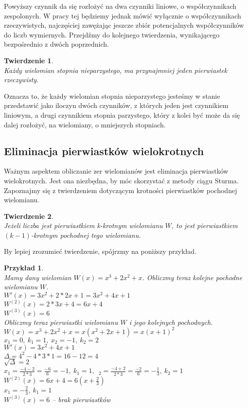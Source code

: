 \documentclass[twoside,a4paper]{book}
\newtheorem{theorem}{Twierdzenie}
\newtheorem{example}{Przykład}
\begin{document}
Powyższy czynnik da się rozłożyć na dwa czynniki liniowe, o współczynnikach zespolonych. W pracy tej będziemy jednak mówić wyłącznie o współczynnikach rzeczywistych, najczęściej zawężając jeszcze zbiór potencjalnych współczynników do liczb wymiernych. Przejdźmy do kolejnego twierdzenia, wynikającego bezpośrednio z dwóch poprzednich.

\begin{theorem}
	$ $\\
	Każdy wielomian stopnia nieparzystego, ma przynajmniej jeden pierwiastek rzeczywisty.
\end{theorem}

Oznacza to, że każdy wielomian stopnia nieparzystego jesteśmy w stanie przedstawić jako iloczyn dwóch czynników, z których jeden jest czynnikiem liniowym, a drugi czynnikiem stopnia parzystego, który z kolei być może da się dalej rozłożyć, na wielomiany, o mniejszych stopniach.

\subsection{Eliminacja pierwiastków wielokrotnych}

Ważnym aspektem obliczanie zer wielomianów jest eliminacja pierwiastków wielokrotnych. Jest ona niezbędna, by móc skorzystać z metody ciągu Sturma. Zapoznajmy się z twierdzeniem dotyczącym krotności pierwiastków pochodnej wielomianu.

\begin{theorem}
	$ $\\
	Jeżeli liczba jest pierwiastkiem k-krotnym wielomianu $W$, to jest pierwiastkiem $(k-1)$-krotnym pochodnej tego wielomianu.
\end{theorem}

By lepiej zrozumieć twierdzenie, spójrzmy na poniższy przykład.

\begin{example}
	$ $\\
	Mamy dany wielomian $W(x) = x^3 + 2x^2 + x$. Obliczmy teraz kolejne pochodne wielomianu $W$. \\
	$W'(x) = 3x^2 + 2*2x + 1 = 3x^2 + 4x + 1 $ \\
	$W^{(2)}(x) = 2*3x + 4 = 6x + 4 $ \\
	$W^{(3)}(x) = 6$ \\
	Obliczmy teraz pierwiastki wielomianu $W$ i jego kolejnych pochodnych. \\
	$W(x) = x^3 + 2x^2 + x = x(x^2 + 2x +1) = x(x + 1)^2$ \\
	$x_1 = 0,\ k_1 = 1,\ x_2 = -1,\ k_2 = 2$ \\
	$W'(x) = 3x^2 + 4x + 1$ \\
	$\Delta = 4^2 - 4*3*1 = 16 - 12 = 4$ \\
	$\sqrt{\Delta} = 2$ \\
	$x_1 = \frac{-4-2}{2*3} = \frac{-6}{6} = -1,\ k_1 = 1,$\ $_2 = \frac{-4+2}{2*3} = \frac{-2}{6} = -\frac{1}{3},\ k_2 = 1$ \\
	$W^{(2)}(x) = 6x + 4 = 6 (x + \frac{2}{3})$ \\
	$x_1 = -\frac{2}{3},\ k_1 = 1$ \\
	$W^{(3)}(x) = 6$ -- brak pierwiastków
\end{example}
\end{document}

